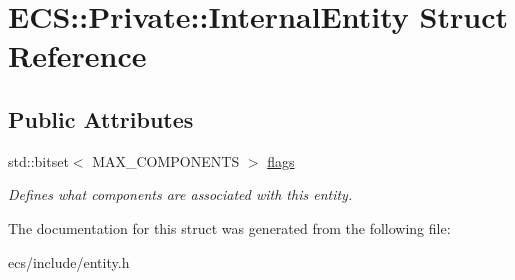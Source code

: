 \hypertarget{struct_e_c_s_1_1_private_1_1_internal_entity}{\section{E\-C\-S\-:\-:Private\-:\-:Internal\-Entity Struct Reference}
\label{struct_e_c_s_1_1_private_1_1_internal_entity}
}
\subsection*{Public Attributes}
\begin{DoxyCompactItemize}
\item 
\hypertarget{struct_e_c_s_1_1_private_1_1_internal_entity_a5e74b188dffd2aee52d0a4f1259eb140}{std\-::bitset$<$ M\-A\-X\-\_\-\-C\-O\-M\-P\-O\-N\-E\-N\-T\-S $>$ \hyperlink{struct_e_c_s_1_1_private_1_1_internal_entity_a5e74b188dffd2aee52d0a4f1259eb140}{flags}}\label{struct_e_c_s_1_1_private_1_1_internal_entity_a5e74b188dffd2aee52d0a4f1259eb140}

\begin{DoxyCompactList}\small\item\em Defines what components are associated with this entity. \end{DoxyCompactList}\end{DoxyCompactItemize}


The documentation for this struct was generated from the following file\-:\begin{DoxyCompactItemize}
\item 
ecs/include/entity.\-h\end{DoxyCompactItemize}
